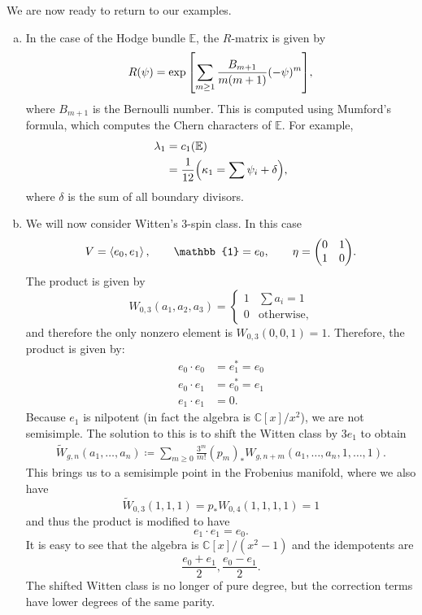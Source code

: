 \documentclass[leqno, openany]{memoir}
\theoremstyle{definition}
\theoremstyle{remark}
\theoremstyle{plain}
\theoremstyle{definition}
\theoremstyle{remark}
\newcommand{\C}{\mathbb{C}}
\newcommand{\wt}[1]{\widetilde{#1}}
\begin{document}
We are now ready to return to our examples.
\begin{enumerate}[(a)]
\item In the case of the Hodge bundle $\mathbb{E}$, the $R$-matrix is given by
  \[ R(\psi) = \exp\qty[\sum_{m\geq 1} \frac{B_{m+1}}{m(m+1)} (-\psi)^m], \]
  where $B_{m+1}$ is the Bernoulli number. This is computed using Mumford's formula, which computes the Chern characters of $\mathbb{E}$. For example,
  \begin{align*}
    \lambda_1 &= c_1(\mathbb{E}) \\
    &= \frac{1}{12}\qty(\kappa_1 = \sum \psi_i + \delta),
  \end{align*}
  where $\delta$ is the sum of all boundary divisors.
\item We will now consider Witten's $3$-spin class. In this case
  \[ V = \ev{e_0, e_1}, \qquad \mathbb{1} = e_0, \qquad \eta = \mqty(0 & 1 \\ 1 & 0). \]
  The product is given by
  \[ W_{0,3}(a_1,a_2,a_3) = \begin{cases}
                              1 & \sum a_i = 1 \\
                              0 & \text{otherwise},
                            \end{cases}
                          \]
  and therefore the only nonzero element is $W_{0,3}(0,0,1) = 1$. Therefore, the product is given by:
  \begin{align*}
    e_0 \cdot e_0 &= e_1^* = e_0 \\
    e_0 \cdot e_1 &= e_0^* = e_1 \\
    e_1 \cdot e_1 &= 0.
  \end{align*}
  Because $e_1$ is nilpotent (in fact the algebra is $\C[x]/x^2$), we are not semisimple. The solution to this is to shift the Witten class by $3e_1$ to obtain
  \begin{align*}
\wt{W}_{g,n}(a_1, \ldots, a_n) \coloneqq \sum_{m\geq 0} \frac{3^m}{m!} (p_m)_* W_{g,n+m}(a_1, \ldots, a_n, 1, \ldots, 1).
  \end{align*}
  This brings us to a semisimple point in the Frobenius manifold, where we also have
  \[ \wt{W}_{0,3} (1,1,1) = p_* W_{0,4}(1,1,1,1) = 1 \]
  and thus the product is modified to have
  \[ e_1 \cdot e_1 = e_0. \]
  It is easy to see that the algebra is $\C[x]/(x^2-1)$ and the idempotents are
  \[ \frac{e_0+e_1}{2}, \frac{e_0-e_1}{2}. \]
  The shifted Witten class is no longer of pure degree, but the correction terms have lower degrees of the same parity.


\end{enumerate}
\end{document}
